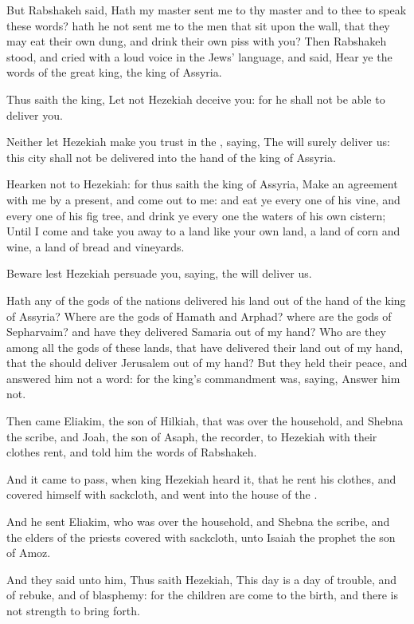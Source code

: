 \Verse But Rabshakeh said, Hath my master sent me to thy master and to thee to speak these words? hath he not sent me to the men that sit upon the wall, that they may eat their own dung, and drink their own piss with you?  \Verse Then Rabshakeh stood, and cried with a loud voice in the Jews' language, and said, Hear ye the words of the great king, the king of Assyria.

\Verse Thus saith the king, Let not Hezekiah deceive you: for he shall not be able to deliver you.

\Verse Neither let Hezekiah make you trust in the \LORD, saying, The \LORD will surely deliver us: this city shall not be delivered into the hand of the king of Assyria.

\Verse Hearken not to Hezekiah: for thus saith the king of Assyria, Make an agreement with me by a present, and come out to me: and eat ye every one of his vine, and every one of his fig tree, and drink ye every one the waters of his own cistern; \Verse Until I come and take you away to a land like your own land, a land of corn and wine, a land of bread and vineyards.

\Verse Beware lest Hezekiah persuade you, saying, the \LORD will deliver us.

Hath any of the gods of the nations delivered his land out of the hand of the king of Assyria?  \Verse Where are the gods of Hamath and Arphad? where are the gods of Sepharvaim? and have they delivered Samaria out of my hand?  \Verse Who are they among all the gods of these lands, that have delivered their land out of my hand, that the \LORD should deliver Jerusalem out of my hand?  \Verse But they held their peace, and answered him not a word: for the king's commandment was, saying, Answer him not.

\Verse Then came Eliakim, the son of Hilkiah, that was over the household, and Shebna the scribe, and Joah, the son of Asaph, the recorder, to Hezekiah with their clothes rent, and told him the words of Rabshakeh.


\Chapter
\Verse And it came to pass, when king Hezekiah heard it, that he rent his clothes, and covered himself with sackcloth, and went into the house of the \LORD.

\Verse And he sent Eliakim, who was over the household, and Shebna the scribe, and the elders of the priests covered with sackcloth, unto Isaiah the prophet the son of Amoz.

\Verse And they said unto him, Thus saith Hezekiah, This day is a day of trouble, and of rebuke, and of blasphemy: for the children are come to the birth, and there is not strength to bring forth.


